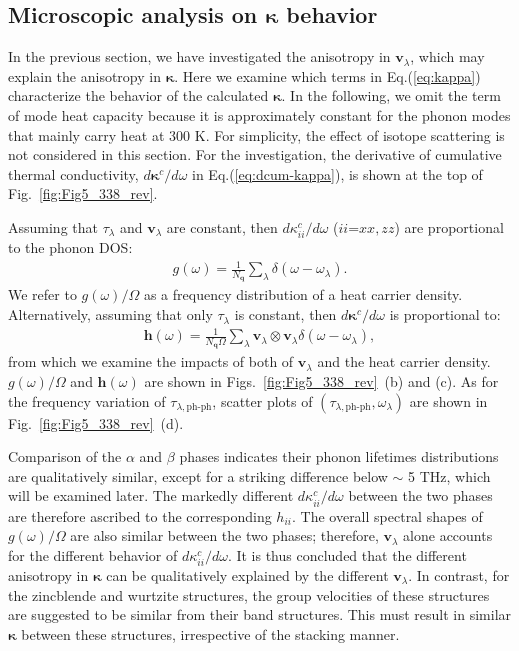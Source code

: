 \documentclass[twocolumn,amsmath,amssymb,a4paper,prb,superscriptaddress,floatfix]{revtex4-1}
\begin{document}
\subsection{Microscopic analysis on $\boldsymbol{\kappa}$ behavior}

In the previous section, we have investigated the anisotropy in
$\mathbf{v}_\lambda$, which may explain the anisotropy in $\boldsymbol{\kappa}$.
Here we examine which terms in Eq.(\ref{eq:kappa}) characterize the behavior of
the calculated $\boldsymbol{\kappa}$. In the following, we omit the term of mode
heat capacity because it is approximately constant for the phonon modes that
mainly carry heat at 300 K. For simplicity, the effect of isotope scattering is
not considered in this section.
For the investigation, the derivative of
cumulative thermal conductivity, $d\boldsymbol{\kappa}^c/d\omega$ in
Eq.(\ref{eq:dcum-kappa}), is shown at the top of Fig.~\ref{fig:Fig5_338_rev}.

Assuming that $\tau_\lambda$ and $\mathbf{v}_\lambda$ are constant, then
$d\kappa_{ii}^c/d\omega$ ($ii$=$xx,zz$) are proportional to the phonon
DOS:
\begin{align}
 \label{eq:dos}
 g(\omega) = \frac{1}{N_\mathbf{q}}
 \sum_\lambda
 \delta(\omega-\omega_{\lambda}).
\end{align}
We refer to $g(\omega)/\Omega$ as a frequency distribution of a heat
carrier density. Alternatively, assuming that only $\tau_\lambda$ is constant,
then $d\boldsymbol{\kappa}^c/d\omega$ is proportional to:
\begin{align}
 \label{eq:wdos}
 \boldsymbol{h}(\omega) = \frac{1}{N_\mathbf{q}\Omega}
 \sum_\lambda
 \mathbf{v}_\lambda \otimes \mathbf{v}_\lambda
 \delta(\omega-\omega_{\lambda}),
\end{align}
from which we examine the impacts of both of $\mathbf{v}_\lambda$ and the heat carrier
density. $g(\omega)/\Omega$ and  $\boldsymbol{h}(\omega)$
are shown in
Figs.~\ref{fig:Fig5_338_rev}~(b) and (c). As for the frequency
variation of $\tau_{\lambda,\text{ph-ph}}$, scatter
plots of $(\tau_{\lambda,\text{ph-ph}},\omega_\lambda)$ are shown in
Fig.~\ref{fig:Fig5_338_rev}~(d).

Comparison of the $\alpha$ and $\beta$ phases indicates their phonon lifetimes
distributions are qualitatively similar, except for a striking difference below
$\sim$ 5 THz, which will be examined later. The markedly different
$d\kappa_{ii}^c/d\omega$ between the two phases are therefore ascribed to the
corresponding $h_{ii}$. The overall spectral shapes of $g(\omega)/\Omega$ are also
similar between the two phases; therefore, $\mathbf{v}_\lambda$ alone accounts
for the different behavior of $d\kappa_{ii}^c/d\omega$. It is thus concluded
that the different anisotropy in $\boldsymbol{\kappa}$ can be qualitatively
explained by the different $\mathbf{v}_\lambda$.
In contrast, for the zincblende and wurtzite
structures, the group velocities of these structures are suggested to be similar from their band
structures\cite{phono3py}.
This must result in similar $\boldsymbol{\kappa}$ between these
structures, irrespective of the stacking manner.
\end{document}
